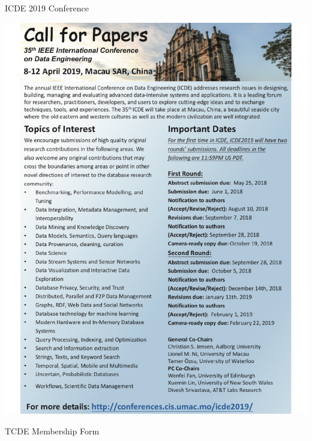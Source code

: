 \documentclass[11pt]{article}
\begin{document}
\begin{bulletin}
\begin{callsection}
%
%
\begin{call}{ICDE 2019 Conference}
\centerline{\includegraphics[width=\textwidth, bb= 0 0 610 790] {../Dec-2018/calls/icde19.pdf}} 
\end{call}
\begin{call}{TCDE Membership Form}

\end{call}
\end{callsection}
\end{bulletin}
\end{document}
